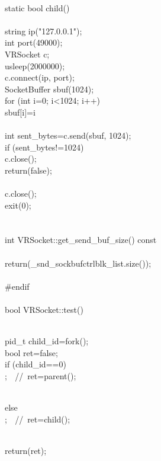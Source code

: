 \documentclass{article}
\begin{document}
\\
 static bool child()
\\
 {
\\
     string ip("127.0.0.1");
\\
     int port(49000);
\\
     VRSocket c;
\\
     usleep(2000000);
\\
     c.connect(ip, port);
\\
     SocketBuffer sbuf(1024);
\\
     for (int i=0; i<1024; i++) {
\\
         sbuf[i]=i%
\\
     }
\\
     int sent_bytes=c.send(sbuf, 1024);
\\
     if (sent_bytes!=1024) {
\\
                 c.close();
\\
         return(false);
\\
         }
\\
     c.close();
\\
     exit(0);
\\
 }
\\
 
\\
 int VRSocket::get_send_buf_size() const
\\
 {
\\
         return(_snd_sockbufctrlblk_list.size());
\\
 }
\\
 #endif
\\
 
\\
 bool VRSocket::test()
\\
 {
\\
     pid_t child_id=fork();
\\
     bool ret=false;
\\
     if (child_id==0)
\\
         ; 
\hbox{// ret=parent();}\strut\\
     else
\\
         ; 
\hbox{// ret=child();}\strut\\
     return(ret);
\\
 }
\end{document}
